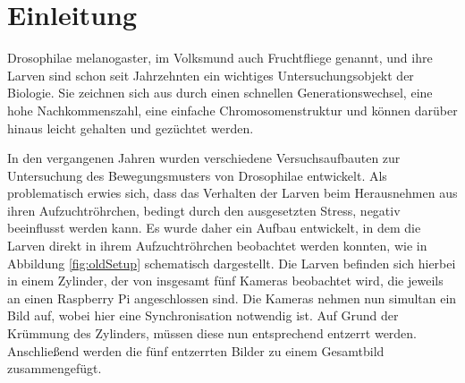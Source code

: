 \chapter{Einleitung}
Drosophilae melanogaster, im Volksmund auch Fruchtfliege genannt, und ihre Larven sind schon seit Jahrzehnten ein wichtiges Untersuchungsobjekt der Biologie. Sie zeichnen sich aus durch einen schnellen Generationswechsel, eine hohe Nachkommenszahl, eine einfache Chromosomenstruktur und können darüber hinaus leicht gehalten und gezüchtet werden.

In den vergangenen Jahren wurden verschiedene Versuchsaufbauten zur Untersuchung des Bewegungsmusters von Drosophilae entwickelt.
Als problematisch erwies sich, dass das Verhalten der Larven beim Herausnehmen aus ihren Aufzuchtröhrchen, bedingt durch den ausgesetzten Stress, negativ beeinflusst werden kann.
Es wurde daher ein Aufbau entwickelt, in dem die Larven direkt in ihrem Aufzuchtröhrchen beobachtet werden konnten, wie in Abbildung \ref{fig:oldSetup} schematisch dargestellt.
Die Larven befinden sich hierbei in einem Zylinder, der von insgesamt fünf Kameras beobachtet wird, die jeweils an einen Raspberry Pi angeschlossen sind. Die Kameras nehmen nun simultan ein Bild auf, wobei hier eine Synchronisation notwendig ist. Auf Grund der Krümmung des Zylinders, müssen diese nun entsprechend entzerrt werden. Anschließend werden die fünf entzerrten Bilder zu einem Gesamtbild zusammengefügt.
